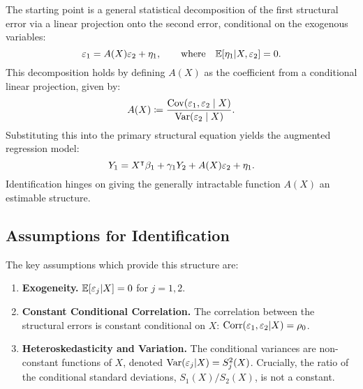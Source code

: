 The starting point is a general statistical decomposition of the first structural error via a linear projection onto the second error, conditional on the exogenous variables:
\[
\varepsilon_1 = A(X)\varepsilon_2 + \eta_1, \qquad \text{where} \quad \mathbb{E}[\eta_1 | X, \varepsilon_2] = 0.
\]
This decomposition holds by defining $A(X)$ as the coefficient from a conditional linear projection, given by:
\[
A(X) \coloneqq \frac{\operatorname{Cov}(\varepsilon_1, \varepsilon_2 \mid X)}{\operatorname{Var}(\varepsilon_2 \mid X)}.
\]
Substituting this into the primary structural equation yields the augmented regression model:
\begin{equation}
Y_1 = X^{\intercal}\beta_1 + \gamma_1 Y_2 + A(X)\varepsilon_2 + \eta_1. \label{eq:cf_model}
\end{equation}
Identification hinges on giving the generally intractable function $A(X)$ an estimable structure.

\subsection{Assumptions for Identification}
The key assumptions which provide this structure are:
\begin{enumerate}[label=(KV\arabic*), ref=(KV\arabic*)]
    \item \label{enu:kv_exogeneity} \textbf{Exogeneity.} $\mathbb{E}[\varepsilon_j | X] = 0$ for $j=1,2$.
    \item \label{enu:kv_corr} \textbf{Constant Conditional Correlation.} The correlation between the structural errors is constant conditional on $X$: $\operatorname{Corr}(\varepsilon_1, \varepsilon_2 | X) = \rho_0$.
    \item \label{enu:kv_het} \textbf{Heteroskedasticity and Variation.} The conditional variances are non-constant functions of $X$, denoted $\operatorname{Var}(\varepsilon_j|X) = S_j^2(X)$. Crucially, the ratio of the conditional standard deviations, $S_1(X)/S_2(X)$, is not a constant.
\end{enumerate}

